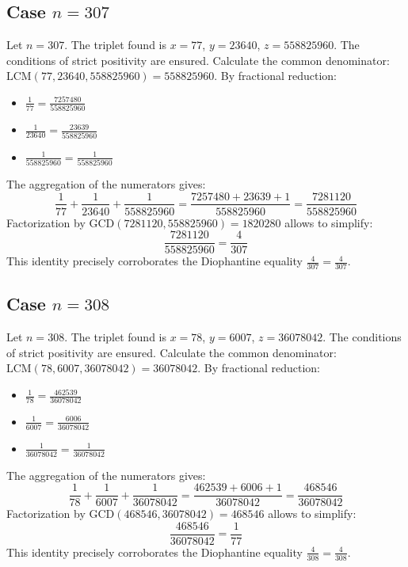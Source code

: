 \documentclass[11pt,a4paper]{article}
\begin{document}
\subsection{Case $n = 307$}
Let $n = 307$. The triplet found is $x = 77$, $y = 23640$, $z = 558825960$.
The conditions of strict positivity are ensured.
Calculate the common denominator: $\text{LCM}(77, 23640, 558825960) = 558825960$.
By fractional reduction:
\begin{itemize}
    \item $\frac{1}{77} = \frac{7257480}{558825960}$
    \item $\frac{1}{23640} = \frac{23639}{558825960}$
    \item $\frac{1}{558825960} = \frac{1}{558825960}$
\end{itemize}
The aggregation of the numerators gives:
$$ \frac{1}{77} + \frac{1}{23640} + \frac{1}{558825960} = \frac{7257480 + 23639 + 1}{558825960} = \frac{7281120}{558825960} $$
Factorization by $\text{GCD}(7281120, 558825960) = 1820280$ allows to simplify:
$$ \frac{7281120}{558825960} = \frac{4}{307} $$
This identity precisely corroborates the Diophantine equality $\frac{4}{307} = \frac{4}{307}$.

\subsection{Case $n = 308$}
Let $n = 308$. The triplet found is $x = 78$, $y = 6007$, $z = 36078042$.
The conditions of strict positivity are ensured.
Calculate the common denominator: $\text{LCM}(78, 6007, 36078042) = 36078042$.
By fractional reduction:
\begin{itemize}
    \item $\frac{1}{78} = \frac{462539}{36078042}$
    \item $\frac{1}{6007} = \frac{6006}{36078042}$
    \item $\frac{1}{36078042} = \frac{1}{36078042}$
\end{itemize}
The aggregation of the numerators gives:
$$ \frac{1}{78} + \frac{1}{6007} + \frac{1}{36078042} = \frac{462539 + 6006 + 1}{36078042} = \frac{468546}{36078042} $$
Factorization by $\text{GCD}(468546, 36078042) = 468546$ allows to simplify:
$$ \frac{468546}{36078042} = \frac{1}{77} $$
This identity precisely corroborates the Diophantine equality $\frac{4}{308} = \frac{4}{308}$.
\end{document}
